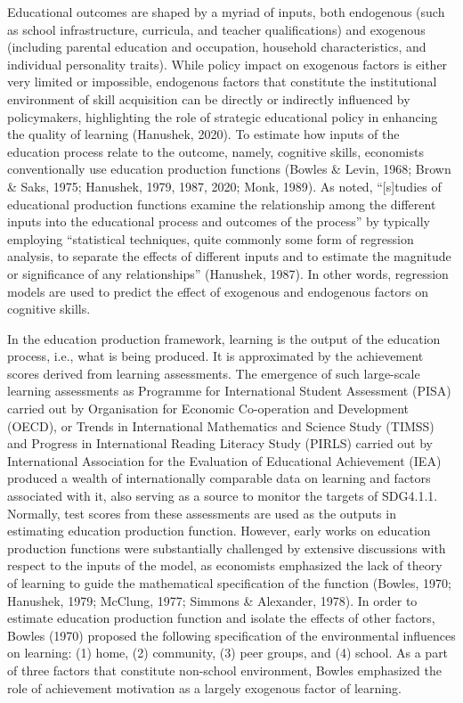 \documentclass[
]{article}
\begin{document}
Educational outcomes are shaped by a myriad of inputs, both endogenous
(such as school infrastructure, curricula, and teacher qualifications)
and exogenous (including parental education and occupation, household
characteristics, and individual personality traits). While policy impact
on exogenous factors is either very limited or impossible, endogenous
factors that constitute the institutional environment of skill
acquisition can be directly or indirectly influenced by policymakers,
highlighting the role of strategic educational policy in enhancing the
quality of learning (Hanushek, 2020). To estimate how inputs of the
education process relate to the outcome, namely, cognitive skills,
economists conventionally use education production functions (Bowles \&
Levin, 1968; Brown \& Saks, 1975; Hanushek, 1979, 1987, 2020; Monk,
1989). As noted, ``{[}s{]}tudies of educational production functions
examine the relationship among the different inputs into the educational
process and outcomes of the process'' by typically employing
``statistical techniques, quite commonly some form of regression
analysis, to separate the effects of different inputs and to estimate
the magnitude or significance of any relationships'' (Hanushek, 1987).
In other words, regression models are used to predict the effect of
exogenous and endogenous factors on cognitive skills.

In the education production framework, learning is the output of the
education process, i.e., what is being produced. It is approximated by
the achievement scores derived from learning assessments. The emergence
of such large-scale learning assessments as Programme for International
Student Assessment (PISA) carried out by Organisation for Economic
Co-operation and Development (OECD), or Trends in International
Mathematics and Science Study (TIMSS) and Progress in International
Reading Literacy Study (PIRLS) carried out by International Association
for the Evaluation of Educational Achievement (IEA) produced a wealth of
internationally comparable data on learning and factors associated with
it, also serving as a source to monitor the targets of SDG4.1.1.
Normally, test scores from these assessments are used as the outputs in
estimating education production function. However, early works on
education production functions were substantially challenged by
extensive discussions with respect to the inputs of the model, as
economists emphasized the lack of theory of learning to guide the
mathematical specification of the function (Bowles, 1970; Hanushek,
1979; McClung, 1977; Simmons \& Alexander, 1978). In order to estimate
education production function and isolate the effects of other factors,
Bowles (1970) proposed the following specification of the environmental
influences on learning: (1) home, (2) community, (3) peer groups, and
(4) school. As a part of three factors that constitute non-school
environment, Bowles emphasized the role of achievement motivation as a
largely exogenous factor of learning.
\end{document}
